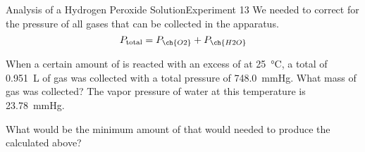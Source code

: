 \documentclass[notes=hide]{beamer}
\begin{document}
\begin{frame}{Analysis of a Hydrogen Peroxide Solution}{Experiment 13}
	We needed to correct for the pressure of all gases that can be
	collected in the apparatus.
	\begin{equation*}
		P_\text{total} = P_{\ch{O2}} + P_{\ch{H2O}}
	\end{equation*}

	\begin{center}
\end{center}
\end{frame}


\begin{onyourown}
	When a certain amount of  is reacted with an excess of
	 at \SI{25}{\celsius}, a total of \SI{0.951}{\liter} of gas
	was collected with a total pressure of \SI{748.0}{\mmHg}. What mass of
	 gas was collected? The vapor pressure of water at this
	temperature is \SI{23.78}{\mmHg}.

	\vspace{15em}

	What would be the minimum amount of  that would needed to produce
	the  calculated above?
\end{onyourown}

\end{document}
